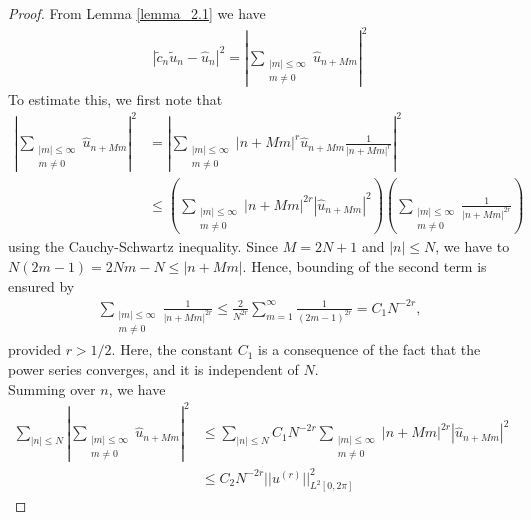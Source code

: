 	\begin{proof}
    From Lemma \ref{lemma_2.1} we have
    \begin{align*}
        |\widetilde{c}_n \widetilde{u}_n - \hat{u}_n|^2 = \displaystyle \left|\sum_{\substack{|m|\leq \infty \\ m \neq 0}} \hat{u}_{n + Mm} \right|^2
    \end{align*}
    To estimate this, we first note that
    \begin{align*}
        \displaystyle \left|\sum_{\substack{|m|\leq \infty \\ m \neq 0}} \hat{u}_{n + Mm} \right|^2 &= \left|\sum_{\substack{|m|\leq \infty \\ m \neq 0}} |n + Mm|^r \hat{u}_{n + Mm} \frac{1}{|n + Mm|^r} \right|^2 \\ 
        &\leq \left(\sum_{\substack{|m|\leq \infty \\ m \neq 0}} |n + Mm|^{2r} |\hat{u}_{n + Mm}|^2 \right) \left(\sum_{\substack{|m|\leq \infty \\ m \neq 0}} \frac{1}{|n + Mm|^{2r}}  \right)
    \end{align*}
    using the Cauchy-Schwartz inequality. Since $M =2N + 1$ and  $|n| \leq N$, we have to $N(2m - 1) = 2Nm - N \leq |n + Mm|$. Hence, bounding of the second term is ensured by
    \begin{align*}
        \displaystyle \sum_{\substack{|m|\leq \infty \\ m \neq 0}} \frac{1}{|n + Mm|^{2r}} \leq \frac{2}{N^{2r}} \sum^{\infty}_{m=1} \frac{1}{(2m - 1)^{2r}} = C_1 N^{-2r},
    \end{align*}
    provided $r > 1/2$. Here, the constant $C_1$ is a consequence of the fact that the power series converges, and it is independent of $N$.\\
    Summing over $n$, we have
    \begin{align*}
        \displaystyle \sum_{|n|\leq N} \left|\sum_{\substack{|m|\leq \infty \\ m \neq 0}} \hat{u}_{n + Mm} \right|^2 &\leq \sum_{|n| \leq N} C_1 N^{-2r} \sum_{\substack{|m|\leq \infty \\ m \neq 0}} |n + Mm|^{2r} |\hat{u}_{n + Mm}|^2 \\
        &\leq C_2 N^{-2r} || u^{(r)} ||^2_{L^2[0, 2\pi]}
    \end{align*}
	\end{proof}

